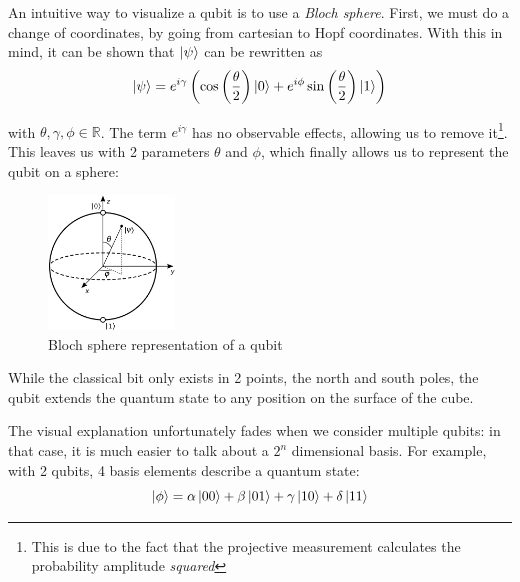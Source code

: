 \documentclass[12pt]{memoir}
\newcommand{\ti}{\textit}
\begin{document}
An intuitive way to visualize a qubit is to use a \ti{Bloch sphere}. First, we must do a change of coordinates, by going from cartesian to Hopf coordinates. With this in mind, it can be shown that $\ket \psi$ can be rewritten as
\begin{equation}
    \ket \psi = e^{i\gamma}\left( \cos\left(\frac{\theta}{2}\right)\ket 0 + e^{i\phi} \sin\left(\frac{\theta}{2}\right)\ket 1\right)
\end{equation}

with $\theta,\gamma,\phi \in \mathbb{R}$. The term $e^{i\gamma}$ has no observable effects, allowing us to remove it\footnote{This is due to the fact that the projective measurement calculates the probability amplitude \textit{squared}}. This leaves us with 2 parameters $\theta$ and $\phi$, which finally allows us to represent the qubit on a sphere:


\begin{figure}[H]

    \centering

    \includegraphics[width=0.3\textwidth]{figures/bloch_sphere.png}

    \caption{Bloch sphere representation of a qubit \cite{wiki:qubit}}

    \label{fig:bloch-sphere}

\end{figure}

While the classical bit only exists in 2 points, the north and south poles, the qubit extends the quantum state to any position on the surface of the cube. \cite{wiki:qubit,book:Nielsen-Chuang-2010}\medbreak


The visual explanation unfortunately fades when we consider multiple qubits: in that case, it is much easier to talk about a $2^n$ dimensional basis. For example, with 2 qubits, 4 basis elements describe a quantum state:
\begin{equation}
    \ket{\phi} = \alpha \ket{00} + \beta \ket{01} + \gamma \ket{10} + \delta \ket{11}
\end{equation}
\end{document}
